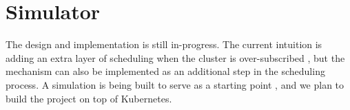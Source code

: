 \section{Simulator}
\noindent The design and implementation is still in-progress. The current intuition is adding an extra layer 
of scheduling when the cluster is over-subscribed \cite{zaharia_delay_2010}, but the mechanism can also be implemented 
as an additional step in the scheduling process. A simulation is being built to serve as a starting point \cite{sched-github}, 
and we plan to build the project on top of Kubernetes.